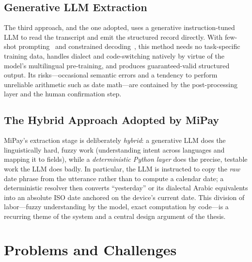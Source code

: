 \subsection{Generative LLM Extraction}

The third approach, and the one adopted, uses a generative instruction-tuned LLM
to read the transcript and emit the structured record directly. With few-shot
prompting~\cite{brown2020gpt3} and constrained
decoding~\cite{willard2023outlines}, this method needs no task-specific training
data, handles dialect and code-switching natively by virtue of the model's
multilingual pre-training, and produces guaranteed-valid structured output. Its
risks---occasional semantic errors and a tendency to perform unreliable
arithmetic such as date math---are contained by the post-processing layer and the
human confirmation step.

\subsection{The Hybrid Approach Adopted by MiPay}
\label{sec:ch1-hybrid}

MiPay's extraction stage is deliberately \emph{hybrid}: a generative LLM does the
linguistically hard, fuzzy work (understanding intent across languages and
mapping it to fields), while a \emph{deterministic Python layer} does the
precise, testable work the LLM does badly. In particular, the LLM is instructed
to copy the \emph{raw} date phrase from the utterance rather than to compute a
calendar date; a deterministic resolver then converts ``yesterday'' or its
dialectal Arabic equivalents into an absolute ISO date anchored on the device's
current date. This division of labor---fuzzy understanding by the model, exact
computation by code---is a recurring theme of the system and a central design
argument of the thesis.

\section{Problems and Challenges}

